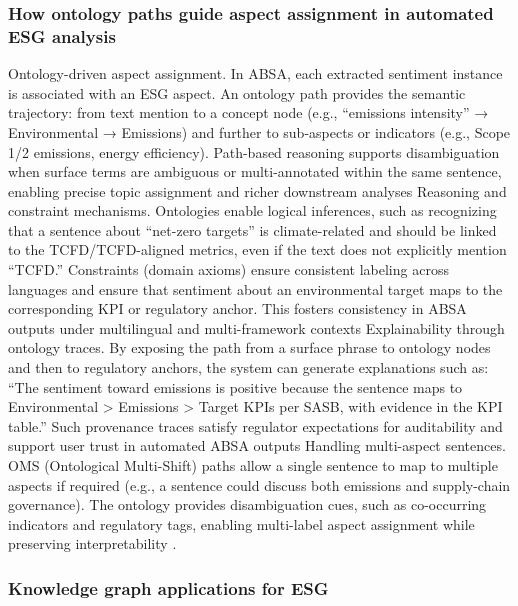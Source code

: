 \subsubsection{How ontology paths guide aspect assignment in automated ESG analysis}

Ontology-driven aspect assignment. In ABSA, each extracted sentiment instance is associated with an ESG aspect. An ontology path provides the semantic trajectory: from text mention to a concept node (e.g., “emissions intensity” → Environmental → Emissions) and further to sub-aspects or indicators (e.g., Scope 1/2 emissions, energy efficiency). Path-based reasoning supports disambiguation when surface terms are ambiguous or multi-annotated within the same sentence, enabling precise topic assignment and richer downstream analyses \cite{10.2139/ssrn.3738629,10.7849/ksnre.2022.0010}
Reasoning and constraint mechanisms. Ontologies enable logical inferences, such as recognizing that a sentence about “net-zero targets” is climate-related and should be linked to the TCFD/TCFD-aligned metrics, even if the text does not explicitly mention “TCFD.” Constraints (domain axioms) ensure consistent labeling across languages and ensure that sentiment about an environmental target maps to the corresponding KPI or regulatory anchor. This fosters consistency in ABSA outputs under multilingual and multi-framework contexts \cite{10.1177/09726225241237304,10.1111/ejed.70225,10.1145/3503044}
Explainability through ontology traces. By exposing the path from a surface phrase to ontology nodes and then to regulatory anchors, the system can generate explanations such as: “The sentiment toward emissions is positive because the sentence maps to Environmental > Emissions > Target KPIs per SASB, with evidence in the KPI table.” Such provenance traces satisfy regulator expectations for auditability and support user trust in automated ABSA outputs \cite{10.1111/reel.12554,10.1111/1475-679x.12575,10.3390/su11041093}
Handling multi-aspect sentences. OMS (Ontological Multi-Shift) paths allow a single sentence to map to multiple aspects if required (e.g., a sentence could discuss both emissions and supply-chain governance). The ontology provides disambiguation cues, such as co-occurring indicators and regulatory tags, enabling multi-label aspect assignment while preserving interpretability \cite{10.3390/su11041093,10.7849/ksnre.2022.0010}
.
\subsubsection{Knowledge graph applications for ESG}


